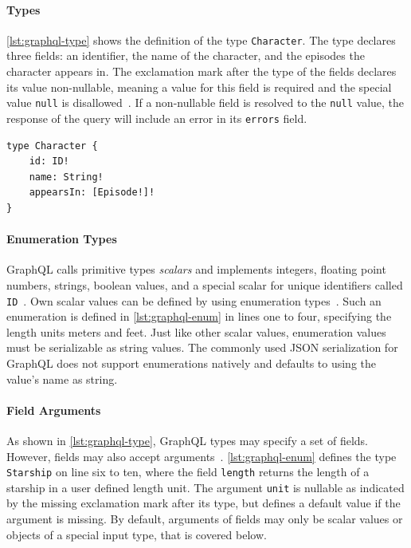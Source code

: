 \paragraph{Types}

\autoref{lst:graphql-type} shows the definition of the type \texttt{Character}.
The type declares three fields: an identifier, the name of the character, and the episodes the character appears in.
The exclamation mark after the type of the fields declares its value non-nullable, meaning a value for this field is required and the special value \texttt{null} is disallowed~\cite{Facebook2018}.
If a non-nullable field is resolved to the \texttt{null} value, the response of the query will include an error in its \texttt{errors} field.

\begin{lstlisting}[caption={GraphQL Type Definition}, language=graphqls, label={lst:graphql-type}]
type Character {
    id: ID!
    name: String!
    appearsIn: [Episode!]!
}
\end{lstlisting}


\paragraph{Enumeration Types}

GraphQL calls primitive types \textit{scalars} and implements integers, floating point numbers, strings, boolean values, and a special scalar for unique identifiers called \texttt{ID}~\cite{Facebook2018}.
Own scalar values can be defined by using enumeration types~\cite{Diaz2020}.
Such an enumeration is defined in \autoref{lst:graphql-enum} in lines one to four, specifying the length units meters and feet.
Just like other scalar values, enumeration values must be serializable as string values.
The commonly used \ac{JSON} serialization for GraphQL does not support enumerations natively and defaults to using the value's name as string.

\paragraph{Field Arguments}

As shown in \autoref{lst:graphql-type}, GraphQL types may specify a set of fields.
However, fields may also accept arguments~\cite{Diaz2020}.
\autoref{lst:graphql-enum} defines the type \texttt{Starship} on line six to ten, where the field \texttt{length} returns the length of a starship in a user defined length unit.
The argument \texttt{unit} is nullable as indicated by the missing exclamation mark after its type, but defines a default value if the argument is missing.
By default, arguments of fields may only be scalar values or objects of a special input type, that is covered below. 

